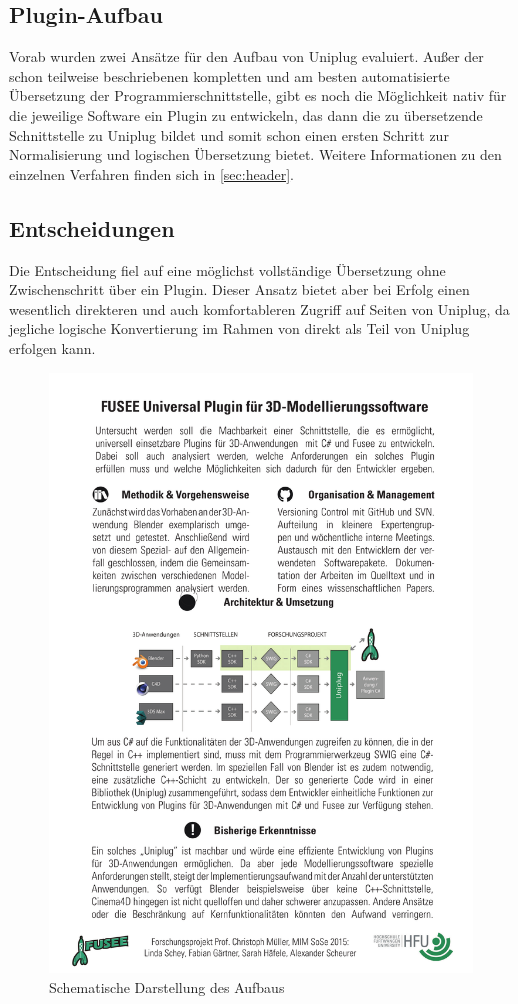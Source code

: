 \subsection{Plugin-Aufbau}
Vorab wurden zwei Ansätze für den Aufbau von Uniplug evaluiert. Außer der schon teilweise beschriebenen kompletten und am besten automatisierte Übersetzung der Programmierschnittstelle, gibt es noch die Möglichkeit nativ für die jeweilige Software ein Plugin zu entwickeln, das dann die zu übersetzende Schnittstelle zu Uniplug bildet und somit schon einen ersten Schritt zur Normalisierung und logischen Übersetzung bietet. Weitere Informationen zu den einzelnen Verfahren finden sich in \ref{sec:header}.

\subsection{Entscheidungen}
Die Entscheidung fiel auf eine möglichst vollständige Übersetzung ohne Zwischenschritt über ein Plugin. Dieser Ansatz bietet aber bei Erfolg einen wesentlich direkteren und auch komfortableren Zugriff auf Seiten von Uniplug, da jegliche logische Konvertierung im Rahmen von \CS direkt als Teil von Uniplug erfolgen kann.

\begin{figure}[htbp]
\center
\includegraphics[width=1\textwidth]{images/aufbau}
\caption{Schematische Darstellung des Aufbaus}
\label{fig:aufbau}
\end{figure}